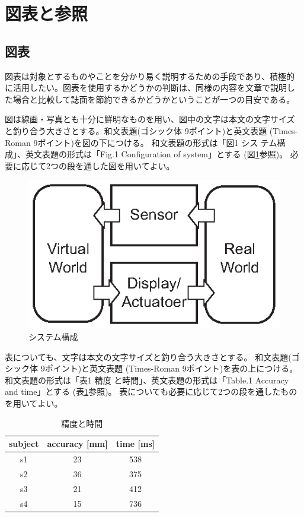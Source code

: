\documentclass[a4paper,twoside]{jarticle}
\begin{document}
\section{図表と参照}

\subsection{図表}
図表は対象とするものやことを分かり易く説明するための手段であり、積極的
に活用したい。図表を使用するかどうかの判断は、同様の内容を文章で説明し
た場合と比較して誌面を節約できるかどうかということが一つの目安である。

図は線画・写真とも十分に鮮明なものを用い、図中の文字は本文の文字サイズ
と釣り合う大きさとする。和文表題(ゴシック体 9ポイント)と英文表題
(Times-Roman 9ポイント)を図の下につける。 和文表題の形式は「図1 シス
テム構成」、英文表題の形式は「Fig.1 Configuration of system」とする
(図\ref{fig:zu}参照)。
必要に応じて2つの段を通した図を用いてよい。

\begin{figure}[ht]
\begin{center}
\includegraphics[scale=1.0]{zu.eps}
\end{center}
\caption{システム構成}
\label{fig:zu}
\end{figure}

表についても、文字は本文の文字サイズと釣り合う大きさとする。
和文表題(ゴシック体 9ポイント)と英文表題
(Times-Roman 9ポイント)を表の上につける。 和文表題の形式は「表1 精度
と時間」、英文表題の形式は「Table.1 Accuracy and time」とする
(表\ref{tab:ta}参照)。
表についても必要に応じて2つの段を通したものを用いてよい。

\begin{table}[ht]
\caption{精度と時間}
\label{tab:ta}
\begin{center}
\begin{tabular}{|c|c|c|}
\hline
subject & accuracy [mm] & time [ms]\\ \hline
s1      & 23       & 538  \\ \hline
s2      & 36       & 375  \\ \hline
s3      & 21       & 412  \\ \hline
s4      & 15       & 736  \\ \hline
\end{tabular}
\end{center}
\end{table}
\end{document}
